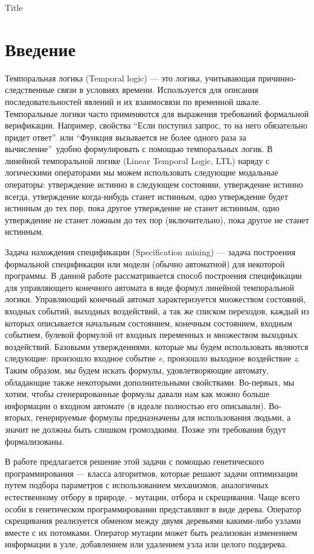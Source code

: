 \documentclass[12pt,fleqn]{article}
\begin{document}
\setlength{\grammarparsep}{0pt plus 1pt minus 1pt}

Title

\section*{Введение}

Темпоральная логика (Temporal logic) --- это логика, учитывающая причинно-следственные связи в условиях времени.
Используется для описания последовательностей явлений и их взаимосвязи по временной шкале.
Темпоральные логики часто применяются для выражения требований формальной верификации.
Например, свойства ``Если поступил запрос, то на него обязательно придет ответ''\ или
``Функция вызывается не более одного раза за вычисление''\ удобно формулировать с помощью темпоральных логик.
В линейной темпоральной логике (Linear Temporal Logic, LTL) наряду с логическими операторами мы можем 
использовать следующие модальные операторы: утверждение истинно в следующем состоянии,
утверждение истинно всегда, утверждение когда-нибудь станет истинным,
одно утверждение будет истинным до тех пор, пока другое утверждение не станет истинным,
одно утверждение не станет ложным до тех пор (включительно), пока другое не станет истинным.

Задача нахождения спецификации (Specification mining) --- задача построения формальной спецификации или модели
(обычно автоматной) для некоторой программы. В данной работе рассматривается способ построения спецификации
для управляющего конечного автомата в виде формул линейной темпоральной логики.
Управляющий конечный автомат характеризуется множеством состояний, входных событий, выходных воздействий,
а так же списком переходов, каждый из которых описывается начальным состоянием, конечным состоянием,
входным событием, булевой формулой от входных переменных и множеством выходных воздействий.
Базовыми утверждениями, которые мы будем использовать являются следующие: произошло входное событие
\emph{e}, произошло выходное воздействие \emph{z}. Таким образом, мы будем искать формулы, удовлетворяющие автомату,
обладающие также некоторыми дополнительными свойствами. Во-первых, мы хотим, чтобы сгенерированные
формулы давали нам как можно больше информации о входном автомате (в идеале полностью его описывали).
Во-вторых, генерируемые формулы предназначены для использования людьми, а значит не должны быть слишком громоздкими.
Позже эти требования будут формализованы.

В работе предлагается решение этой задачи с помощью генетического программирования --- класса алгоритмов,
которые решают задачи оптимизации путем подбора параметров с использованием механизмов, аналогичных естественному
отбору в природе, - мутации, отбора и скрещивания. Чаще всего особи в генетическом программировании представляют
в виде дерева. Оператор скрещивания реализуется обменом между двумя деревьями какими-либо узлами вместе с их
потомками. Оператор мутации может быть реализован изменением информации в узле, добавлением или удалением узла
или целого поддерева.
\end{document}
